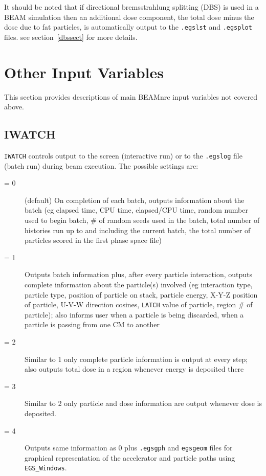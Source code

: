 \documentclass[12pt,twoside]{article}
\begin{document}
It should be noted that if directional bremsstrahlung splitting (DBS)
is used in a BEAM simulation then an
additional dose component, the total dose minus the dose due to
fat particles, is automatically output to the {\tt .egslst} and
{\tt .egsplot} files.  see section~\ref{dbssect} for more details.

\section{Other Input Variables}
\label{oiv}

This section provides descriptions of main BEAMnrc input variables not
covered above.

\subsection{IWATCH}
\label{iwatchsect}

\verb+IWATCH+ controls output to the screen (interactive run) or to the
\verb+.egslog+ file (batch run) during beam execution.  The possible settings
are:
\begin{description}
\item [= 0] (default) On completion of each batch, outputs information about the
batch (eg elapsed time, CPU time, elapsed/CPU time, random number used
to begin batch, \# of random seeds used in the batch, total number of
histories run up to and including the current batch, the total number of
particles scored in the first phase space file)

\item [= 1] Outputs batch information plus, after every particle
interaction, outputs complete information about the particle(s)
involved (eg interaction type, particle type, position of particle on
stack, particle energy, X-Y-Z position of particle, U-V-W direction
cosines, \verb+LATCH+ value of particle, region \# of particle); also informs
user when a particle is being discarded, when a particle is passing from
one CM to another

\item [= 2] Similar to 1 only complete particle information is output at
every step; also outputs total dose in a region whenever energy is
deposited there

\item [= 3] Similar to 2 only particle and dose information are output
whenever dose is deposited.

\item [= 4] Outputs same information as 0 plus \verb+.egsgph+ and
\verb+egsgeom+
files for graphical representation of the accelerator and particle paths
using \verb+EGS_Windows+\cite{TR99a}.
\end{description}
\end{document}
